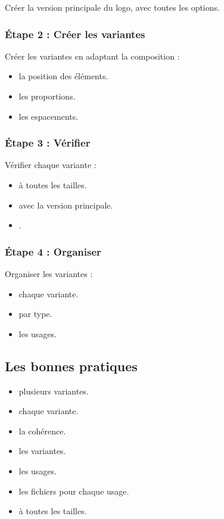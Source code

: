 Créer la version principale du logo, avec toutes les options.

\subsubsection{Étape 2 : Créer les variantes}

Créer les variantes en adaptant la composition :

\begin{itemize}
    \item {} la position des éléments.
    \item {} les proportions.
    \item {} les espacements.
\end{itemize}

\subsubsection{Étape 3 : Vérifier}

Vérifier chaque variante :

\begin{itemize}
    \item {} à toutes les tailles.
    \item {} avec la version principale.
    \item {}.
\end{itemize}

\subsubsection{Étape 4 : Organiser}

Organiser les variantes :

\begin{itemize}
    \item {} chaque variante.
    \item {} par type.
    \item {} les usages.
\end{itemize}

\subsection{Les bonnes pratiques}

\begin{itemize}
    \item {} plusieurs variantes.
    \item {} chaque variante.
    \item {} la cohérence.
    \item {} les variantes.
    \item {} les usages.
    \item {} les fichiers pour chaque usage.
    \item {} à toutes les tailles.
\end{itemize}

